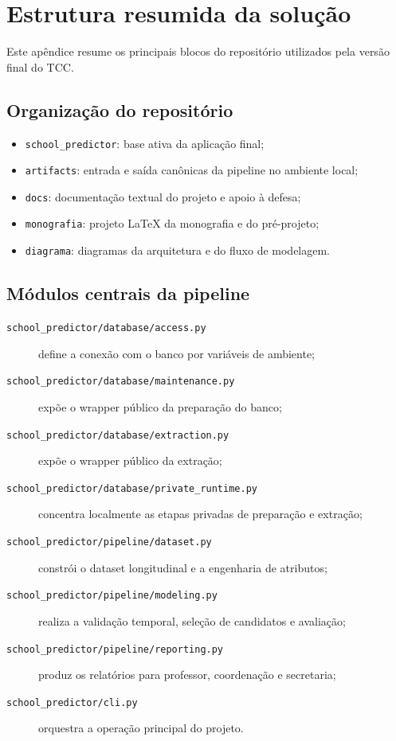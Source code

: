 \chapter{Estrutura resumida da solu\c{c}\~ao}
\label{apend:estrutura}

Este ap\^endice resume os principais blocos do reposit\'orio utilizados pela vers\~ao final do TCC.

\section{Organiza\c{c}\~ao do reposit\'orio}

\begin{itemize}
    \item \texttt{school\_predictor}: base ativa da aplica\c{c}\~ao final;
    \item \texttt{artifacts}: entrada e sa\'ida can\^onicas da pipeline no ambiente local;
    \item \texttt{docs}: documenta\c{c}\~ao textual do projeto e apoio \`a defesa;
    \item \texttt{monografia}: projeto LaTeX da monografia e do pr\'e-projeto;
    \item \texttt{diagrama}: diagramas da arquitetura e do fluxo de modelagem.
\end{itemize}

\section{M\'odulos centrais da pipeline}

\begin{description}
    \item[\texttt{school\_predictor/database/access.py}] define a conex\~ao com o banco por vari\'aveis de ambiente;
    \item[\texttt{school\_predictor/database/maintenance.py}] exp\~oe o wrapper p\'ublico da prepara\c{c}\~ao do banco;
    \item[\texttt{school\_predictor/database/extraction.py}] exp\~oe o wrapper p\'ublico da extra\c{c}\~ao;
    \item[\texttt{school\_predictor/database/private\_runtime.py}] concentra localmente as etapas privadas de prepara\c{c}\~ao e extra\c{c}\~ao;
    \item[\texttt{school\_predictor/pipeline/dataset.py}] constr\'oi o dataset longitudinal e a engenharia de atributos;
    \item[\texttt{school\_predictor/pipeline/modeling.py}] realiza a valida\c{c}\~ao temporal, sele\c{c}\~ao de candidatos e avalia\c{c}\~ao;
    \item[\texttt{school\_predictor/pipeline/reporting.py}] produz os relat\'orios para professor, coordena\c{c}\~ao e secretaria;
    \item[\texttt{school\_predictor/cli.py}] orquestra a opera\c{c}\~ao principal do projeto.
\end{description}

